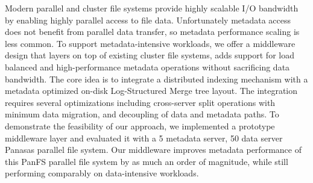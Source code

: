 
Modern parallel and cluster file systems provide highly scalable I/O bandwidth
by enabling highly parallel access to file data.
Unfortunately metadata access does not benefit from parallel data transfer,
so metadata performance scaling is less common.
To support metadata-intensive workloads,
we offer a middleware design that layers on top of existing cluster
file systems, adds support for load balanced and
high-performance metadata operations without sacrificing data bandwidth.
The core idea is to integrate a distributed indexing mechanism
with a metadata optimized on-disk Log-Structured Merge tree layout.
The integration requires several optimizations including cross-server split
operations with minimum data migration, and decoupling of
data and metadata paths. To demonstrate the feasibility of our approach,
we implemented a prototype middleware layer \sys
and evaluated it with a 5 metadata server, 50 data server Panasas
parallel file system. Our \sys middleware improves
metadata performance of this PanFS parallel file system by
as much an order of magnitude,
while still performing comparably on data-intensive workloads.
